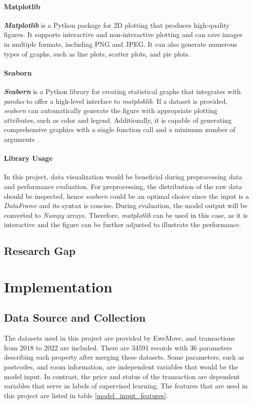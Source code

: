 \documentclass[12pt,twoside]{report}
\begin{document}
\subsubsection{Matplotlib}
\textbf{\textit{Matplotlib}} is a Python package for 2D plotting that produces high-quality figures. It supports interactive and non-interactive plotting and can save images in multiple formats, including PNG and JPEG. It can also generate numerous types of graphs, such as line plots, scatter plots, and pie plots.

\subsubsection{Seaborn}
\textbf{\textit{Seaborn}} is a Python library for creating statistical graphs that integrates with \textit{pandas} to offer a high-level interface to \textit{matploblib}. If a dataset is provided, \textit{seaborn} can automatically generate the figure with appropriate plotting attributes, such as color and legend. Additionally, it is capable of generating comprehensive graphics with a single function call and a minimum number of arguments \citep{RN16}.

\subsubsection{Library Usage}
In this project, data visualization would be beneficial during preprocessing data and performance evaluation. For preprocessing, the distribution of the raw data should be inspected, hence \textit{seaborn} could be an optimal choice since the input is a \textit{DataFrame} and its syntax is concise. During evaluation, the model output will be converted to \textit{Numpy} arrays. Therefore, \textit{matplotlib} can be used in this case, as it is interactive and the figure can be further adjusted to illustrate the performance. 

\section{Research Gap}

\chapter{Implementation}
\section{Data Source and Collection}
The datasets used in this project are provided by EweMove, and transactions from 2018 to 2022 are included. There are 34591 records with 36 parameters describing each property after merging these datasets. Some parameters, such as postcodes, and room information, are independent variables that would be the model input. In contrast, the price and status of the transaction are dependent variables that serve as labels of supervised learning. The features that are used in this project are listed in table \ref{model_input_features}. 
\end{document}
